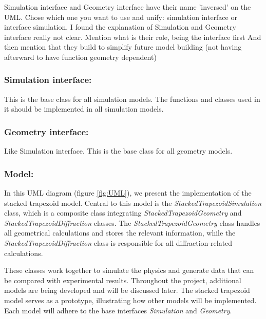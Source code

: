 \FloatBarrier

\color{red}Simulation interface and Geometry interface have their name 'inversed' on the UML. Chose which one you want to use and unify: simulation interface or interface simulation.
I found the explanation of Simulation and Geometry interface really not clear.
Mention what is their role, being the interface first
And then mention that they build to simplify future model building (not having afterward to have function geometry dependent)
\color{black}

\subsubsection*{\textbf{Simulation interface:}}

This is the base class for all simulation models. The functions and classes used in it should be implemented
in all simulation models.

\subsubsection*{\textbf{Geometry interface:}}

Like Simulation interface. This is the base class for all geometry models.


\subsubsection*{\textbf{Model:}}

In this UML diagram (figure \ref{fig:UML}), we present the implementation of the stacked trapezoid model.
 Central to this model is the \textit{StackedTrapezoidSimulation} class, which is a composite class 
 integrating \textit{StackedTrapezoidGeometry} and \textit{StackedTrapezoidDiffraction} classes. The 
 \textit{StackedTrapezoidGeometry} class handles all geometrical calculations and stores the relevant 
 information, while the \textit{StackedTrapezoidDiffraction} class is responsible for all diffraction-related 
 calculations.

 \medskip

These classes work together to simulate the physics and generate data that can be compared with experimental
results. Throughout the project, additional models are being developed and will be discussed later. The stacked 
trapezoid model serves as a prototype, illustrating how other models will be implemented. Each model will 
adhere to the base interfaces \textit{Simulation} and \textit{Geometry}.

